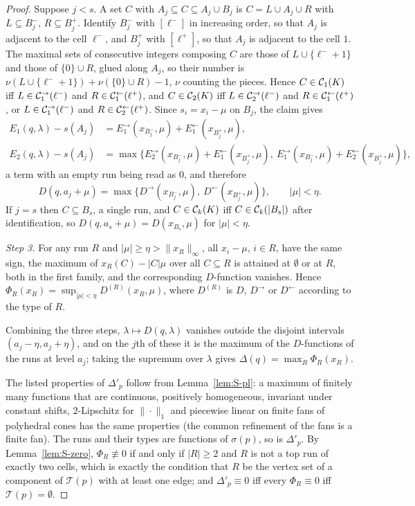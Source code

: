 \begin{proof}
Suppose $j<s$. A set $C$ with $A_j\subseteq C\subseteq A_j\cup B_j$ is $C=L\cup A_j\cup R$ with $L\subseteq B^-_j$, $R\subseteq B^+_j$. Identify $B^-_j$ with $[\ell^-]$ in increasing order, so that $A_j$ is adjacent to the cell $\ell^-$, and $B^+_j$ with $[\ell^+]$, so that $A_j$ is adjacent to the cell $1$. The maximal sets of consecutive integers composing $C$ are those of $L\cup\{\ell^-+1\}$ and those of $\{0\}\cup R$, glued along $A_j$, so their number is $\nu(L\cup\{\ell^-+1\})+\nu(\{0\}\cup R)-1$, $\nu$ counting the pieces. Hence $C\in\mathcal{C}_1(K)$ iff $L\in\mathcal{C}^{\to}_1(\ell^-)$ and $R\in\mathcal{C}^{\leftarrow}_1(\ell^+)$, and $C\in\mathcal{C}_2(K)$ iff $L\in\mathcal{C}^{\to}_2(\ell^-)$ and $R\in\mathcal{C}^{\leftarrow}_1(\ell^+)$, or $L\in\mathcal{C}^{\to}_1(\ell^-)$ and $R\in\mathcal{C}^{\leftarrow}_2(\ell^+)$. Since $s_i=x_i-\mu$ on $B_j$, the claim gives
\begin{align*}
E_1(q,\lambda)-s(A_j)&=E^{\to}_1(x_{B^-_j},\mu)+E^{\leftarrow}_1(x_{B^+_j},\mu),\\
E_2(q,\lambda)-s(A_j)&=\max\bigl\{E^{\to}_2(x_{B^-_j},\mu)+E^{\leftarrow}_1(x_{B^+_j},\mu),\ E^{\to}_1(x_{B^-_j},\mu)+E^{\leftarrow}_2(x_{B^+_j},\mu)\bigr\},
\end{align*}
a term with an empty run being read as $0$, and therefore
\begin{equation}\label{eq:supp-decouple}
D(q,a_j+\mu)=\max\bigl\{D^{\to}(x_{B^-_j},\mu),\ D^{\leftarrow}(x_{B^+_j},\mu)\bigr\},\qquad |\mu|<\eta.
\end{equation}
If $j=s$ then $C\subseteq B_s$, a single run, and $C\in\mathcal{C}_k(K)$ iff $C\in\mathcal{C}_k(|B_s|)$ after identification, so $D(q,a_s+\mu)=D(x_{B_s},\mu)$ for $|\mu|<\eta$.

\emph{Step 3.} For any run $R$ and $|\mu|\ge\eta>\|x_R\|_\infty$, all $x_i-\mu$, $i\in R$, have the same sign, the maximum of $x_R(C)-|C|\mu$ over all $C\subseteq R$ is attained at $\emptyset$ or at $R$, both in the first family, and the corresponding $D$-function vanishes. Hence $\Phi_R(x_R)=\sup_{|\mu|<\eta}D^{(R)}(x_R,\mu)$, where $D^{(R)}$ is $D$, $D^{\to}$ or $D^{\leftarrow}$ according to the type of $R$.

Combining the three steps, $\lambda\mapsto D(q,\lambda)$ vanishes outside the disjoint intervals $(a_j-\eta,a_j+\eta)$, and on the $j$th of these it is the maximum of the $D$-functions of the runs at level $a_j$; taking the supremum over $\lambda$ gives $\Delta(q)=\max_R\Phi_R(x_R)$.

The listed properties of $\Delta'_p$ follow from Lemma~\ref{lem:S-pl}: a maximum of finitely many functions that are continuous, positively homogeneous, invariant under constant shifts, $2$-Lipschitz for $\|\cdot\|_1$ and piecewise linear on finite fans of polyhedral cones has the same properties (the common refinement of the fans is a finite fan). The runs and their types are functions of $\sigma(p)$, so is $\Delta'_p$. By Lemma~\ref{lem:S-zero}, $\Phi_R\not\equiv0$ if and only if $|R|\ge2$ and $R$ is not a top run of exactly two cells, which is exactly the condition that $R$ be the vertex set of a component of $\mathcal T(p)$ with at least one edge; and $\Delta'_p\equiv0$ iff every $\Phi_R\equiv0$ iff $\mathcal T(p)=\emptyset$.
\end{proof}

